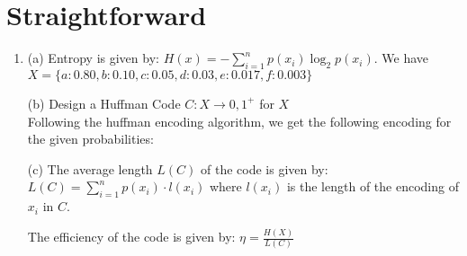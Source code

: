 \documentclass[a4paper]{article}
\begin{document}
\section{Straightforward}
\begin{enumerate}
\item (a) Entropy is given by: $H(x) = -\sum_{i=1}^{n} p(x_i) \log_2 p(x_i)$. We have $X = 
\{a : 0.80, b : 0.10, c : 0.05, d : 0.03, e : 0.017, f : 0.003\}$ 


(b) Design a Huffman Code $C: X \rightarrow {0, 1}^+$ for $X$\\
Following the huffman encoding algorithm, we get the following encoding for the given probabilities:


(c) The average length $L(C)$ of the code is given by: $L(C) = \sum_{i=1}^{n} p(x_i) \cdot l(x_i)$ where $l(x_i)$ is the length of the encoding of $x_i$ in $C$.\\


The efficiency of the code is given by: $\eta = \frac{H(X)}{L(C)}$


\end{enumerate}
\end{document}
